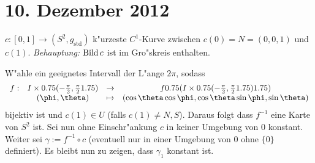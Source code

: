 
\section{10. Dezember 2012}
\setcounter{Aufg}{0} %
\setcounter{Loes}{0}

\begin{Loes}
$c: [0,1] \to (S^2, g_{\text{std}})$ k"urzeste $C^1$-Kurve zwischen $c(0) = N = (0,0,1)$ und $c(1)$. \emph{Behauptung:} $\operatorname{Bild} c$ ist im Gro"skreis enthalten.

W"ahle ein geeignetes Intervall der L"ange $2 \pi$, sodass
	\[\begin{array}{cccc} f: & I \X \left( -\frac{\pi}{2}, \frac{\pi}{2} \right) &\to& f \left( I \X \left( -\frac{\pi}{2}, \frac{\pi}{2} \right) \right)\\
		& (\phi, \theta) &\mapsto& (\cos\theta \cos\phi, \cos\theta\sin\phi, \sin\theta)\end{array}\]
bijektiv ist und $c(1) \in U$ (falls $c(1) \ne N,S$). Daraus folgt dass $f^{-1}$ eine Karte von $S^2$ ist. Sei nun ohne Einschr"ankung $c$ in keiner Umgebung von $0$ konstant. Weiter sei $\gamma := f^{-1} \circ c$ (eventuell nur in einer Umgebung von $0$ ohne $\{0\}$ definiert). Es bleibt nun zu zeigen, dass $\gamma_1$ konstant ist.


\end{Loes}
